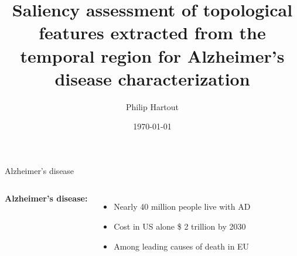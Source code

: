\documentclass[aspectratio=169, 10pt, dvipsnames]{beamer}
\title{Saliency assessment of topological features extracted from the temporal region for Alzheimer's disease characterization}
\date{\today}
\author{Philip Hartout}
\begin{document}
\maketitle


\begin{frame}[fragile]{Alzheimer's disease}

  \begin{columns}[T,onlytextwidth]
    \textbf{Alzheimer's disease:} \brain
    \begin{itemize}
    \item Nearly 40 million people live with AD
    \item Cost in US alone \$ 2 trillion by 2030
    \item Among leading causes of death in EU
    \end{itemize}
\end{columns}
\end{frame}
\end{document}
